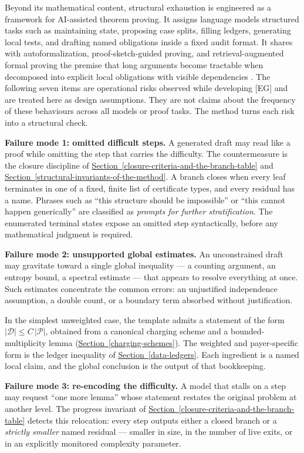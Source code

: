 \documentclass[
  11pt,
]{article}
\theoremstyle{definition}
\newcommand{\secref}[1]{\hyperref[#1]{Section~\ref*{#1}}}
\begin{document}
Beyond its mathematical content, structural exhaustion is engineered as
a framework for AI-assisted theorem proving. It assigns language models
structured tasks such as maintaining state, proposing case splits,
filling ledgers, generating local tests, and drafting named obligations
inside a fixed audit format. It shares with
autoformalization, proof-sketch-guided proving, and retrieval-augmented
formal proving the premise that long arguments become tractable when
decomposed into explicit local obligations with visible dependencies
\citep{wu-etal-2022-autoformalization, jiang-etal-2022-draft-sketch-prove, yang-etal-2023-leandojo}.
The following seven items are operational risks observed while developing
[EG] and are treated here as design assumptions. They are not claims
about the frequency of these behaviours across all models or proof
tasks. The method turns each risk into a structural check.

\textbf{Failure mode 1: omitted difficult steps.} A generated draft may
read like a proof while omitting the step that carries the difficulty.
The countermeasure is the closure discipline of
\secref{closure-criteria-and-the-branch-table} and
\secref{structural-invariants-of-the-method}. A branch closes when every leaf
terminates in one of a fixed, finite list of certificate types, and
every residual has a name. Phrases such as ``this structure should be
impossible'' or ``this cannot happen generically'' are classified as
\emph{prompts for further stratification}. The enumerated terminal
states expose an omitted step syntactically, before any mathematical
judgment is required.

\textbf{Failure mode 2: unsupported global estimates.} An unconstrained
draft may gravitate toward a single global inequality --- a
counting argument, an entropy bound, a spectral estimate --- that
appears to resolve everything at once. Such estimates concentrate the
common errors: an unjustified independence assumption, a double count,
or a boundary term absorbed without justification.

In the simplest unweighted case, the template admits a statement of the
form \(|\mathcal D|\le C\,|\mathcal P|\), obtained from a canonical
charging scheme and a bounded-multiplicity lemma
(\secref{charging-schemes}). The weighted and payer-specific form is the
ledger inequality of \secref{data-ledgers}. Each ingredient is a named
local claim, and the global conclusion is the output of that bookkeeping.

\textbf{Failure mode 3: re-encoding the difficulty.} A model that stalls
on a step may request ``one more lemma'' whose statement restates
the original problem at another level. The progress invariant of \secref{closure-criteria-and-the-branch-table} detects this relocation: every step outputs either a closed branch or
a \emph{strictly smaller} named residual --- smaller in size, in the
number of live exits, or in an explicitly monitored complexity
parameter.
\end{document}
